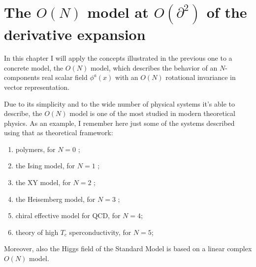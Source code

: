      
\chapter{The $O(N)$ model at $O(\partial^2)$ of the derivative expansion}
\noindent
In this chapter I will apply the concepts illustrated in the previous one to a concrete model, the $O(N)$ model, 
which describes the behavior of an $N$-components real scalar field $\phi^a(x)$ with an $O(N)$ rotational invariance in vector representation. 


Due to its simplicity and to the wide number of physical systems it's able to describe, the $O(N)$ model is one of the most studied in 
modern theoretical physics. 
As an example, I remember here just some of the systems described using that as theoretical framework:
\begin{enumerate}
 \item polymers, for $N = 0$ \cite{polimeri};
 \item the Ising model, for $N = 1$ \cite{ising};
 \item the XY model, for $N = 2$ \cite{xy};
 \item the Heisemberg model, for $N = 3$ \cite{Polyakov};
 \item chiral effective model for QCD, for $N = 4$\cite{hidaka};
 \item theory of high $T_c$ sperconductivity, for $N = 5$\cite{super};
\end{enumerate}
Moreover, also the Higgs field of the Standard Model is based on a linear complex $O(N)$ model.

